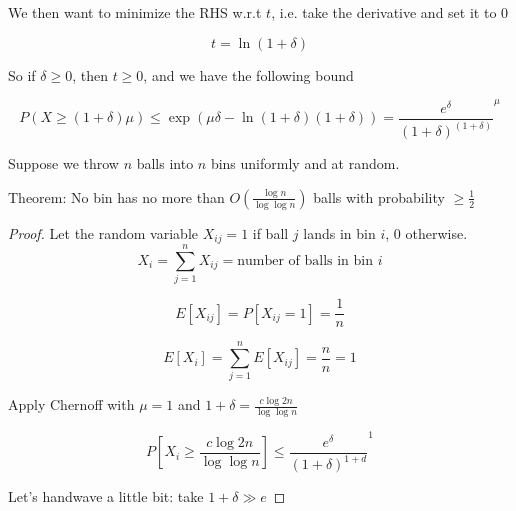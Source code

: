 \documentclass[../notes.tex]{subfiles}
\begin{document}
We then want to minimize the RHS w.r.t $ t $, i.e. take the derivative and set it to 0

\begin{equation}
    t = \ln (1+\delta)
\end{equation}

So if $ \delta \ge 0  $, then $ t \ge 0 $, and we have the following bound

\begin{equation}
    P(X \ge  (1+\delta)\mu) \le  \exp \left( \mu \delta - \ln (1+\delta) (1+\delta) \right)  = \frac{e^\delta}{(1+\delta)^{(1+\delta)}}^\mu
\end{equation}



\begin{example}
    Suppose we throw $ n $ balls into $ n $ bins uniformly and at random.

\begin{theorem}
Theorem: No bin has no more than $ O(\frac{\log n}{ \log \log n }) $ balls with probability $ \ge  \frac{1}{2} $
\end{theorem}


\begin{proof}

Let the random variable $ X_{ij} = 1 $ if ball $ j $ lands in bin $ i $, $ 0 $ otherwise.
\begin{equation}
    X_{i} = \sum^n_{j=1} X_{ij} = \text{number of balls in bin } i
\end{equation}

\begin{equation}
    E[X_{ij}] = P[X_{ij} = 1] = \frac{1}{n}
\end{equation}

\begin{equation}
    E[X_i] = \sum^n_{j=1} E[X_{ij}] = \frac{n}{n} = 1
\end{equation} 


Apply Chernoff with $ \mu = 1 $ and $ 1+\delta = \frac{c \log 2n}{ \log \log n } $

\begin{equation}
    P[X_i \ge   \frac{c \log 2n}{ \log \log n }] \le \frac{e^\delta}{(1+\delta)^{1+d}}^1
\end{equation}


Let's handwave a little bit: take $ 1+\delta \gg e $ 


\end{proof}
\end{example}
\end{document}
